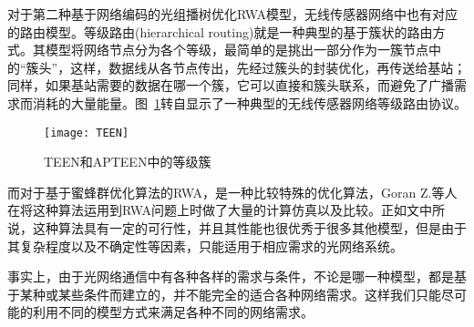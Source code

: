 \documentclass[11pt,twocolumn]{ctexart}
\begin{document}
对于第二种基于网络编码的光组播树优化RWA模型，无线传感器网络中也有对应的路由模型。等级路由(hierarchical routing)就是一种典型的基于簇状的路由方式。其模型将网络节点分为各个等级，最简单的是挑出一部分作为一簇节点中的“簇头”，这样，数据线从各节点传出，先经过簇头的封装优化，再传送给基站；同样，如果基站需要的数据在哪一个簇，它可以直接和簇头联系，而避免了广播需求而消耗的大量能量。图~\ref{TEEN}转自\cite{11}显示了一种典型的无线传感器网络等级路由协议。
\begin{figure}[!hbtp]
  \begin{center}
  \texttt{[image: TEEN]}
  \end{center}
  \caption{TEEN和APTEEN中的等级簇}
  \label{TEEN}
\end{figure}

而对于基于蜜蜂群优化算法的RWA，是一种比较特殊的优化算法，Goran Z.等人在将这种算法运用到RWA问题上时做了大量的计算仿真以及比较\cite{6}。正如文中所说，这种算法具有一定的可行性，并且其性能也很优秀于很多其他模型，但是由于其复杂程度以及不确定性等因素，只能适用于相应需求的光网络系统。

事实上，由于光网络通信中有各种各样的需求与条件，不论是哪一种模型，都是基于某种或某些条件而建立的，并不能完全的适合各种网络需求。这样我们只能尽可能的利用不同的模型方式来满足各种不同的网络需求。
\end{document}

